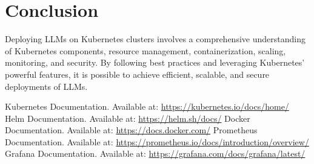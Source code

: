 \section{Conclusion}

Deploying LLMs on Kubernetes clusters involves a comprehensive understanding of Kubernetes components, resource management, containerization, scaling, monitoring, and security. By following best practices and leveraging Kubernetes' powerful features, it is possible to achieve efficient, scalable, and secure deployments of LLMs.

\begin{thebibliography}{9}
 Kubernetes Documentation. Available at: \url{https://kubernetes.io/docs/home/}
 Helm Documentation. Available at: \url{https://helm.sh/docs/}
 Docker Documentation. Available at: \url{https://docs.docker.com/}
 Prometheus Documentation. Available at: \url{https://prometheus.io/docs/introduction/overview/}
 Grafana Documentation. Available at: \url{https://grafana.com/docs/grafana/latest/}
\end{thebibliography}